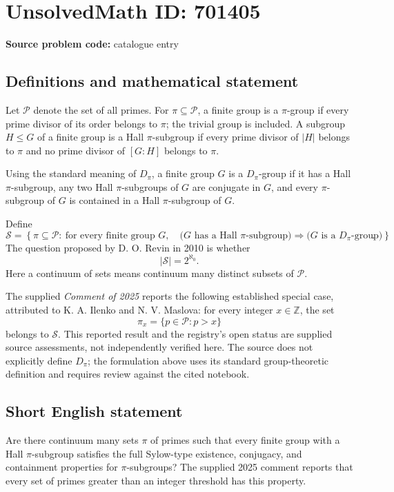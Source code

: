 \documentclass[11pt]{article}
\newcommand{\Z}{\mathbb{Z}}
\begin{document}
\section*{UnsolvedMath ID: 701405}
\textbf{Source problem code:} catalogue entry
\subsection{Definitions and mathematical statement}
Let \(\mathcal P\) denote the set of all primes. For \(\pi\subseteq\mathcal P\), a finite group is a \(\pi\)-group if every prime divisor of its order belongs to \(\pi\); the trivial group is included. A subgroup \(H\leq G\) of a finite group is a Hall \(\pi\)-subgroup if every prime divisor of \(|H|\) belongs to \(\pi\) and no prime divisor of \([G:H]\) belongs to \(\pi\).

Using the standard meaning of \(D_\pi\), a finite group \(G\) is a \(D_\pi\)-group if it has a Hall \(\pi\)-subgroup, any two Hall \(\pi\)-subgroups of \(G\) are conjugate in \(G\), and every \(\pi\)-subgroup of \(G\) is contained in a Hall \(\pi\)-subgroup of \(G\).

Define
\[
\mathcal S=\left\{\pi\subseteq\mathcal P:\ \text{for every finite group }G,\quad
\bigl(G\text{ has a Hall }\pi\text{-subgroup}\bigr)
\Longrightarrow
\bigl(G\text{ is a }D_\pi\text{-group}\bigr)
\right\}.
\]
The question proposed by D. O. Revin in 2010 is whether
\[
|\mathcal S|=2^{\aleph_0}.
\]
Here a continuum of sets means continuum many distinct subsets of \(\mathcal P\).

The supplied \emph{Comment of 2025} reports the following established special case, attributed to K. A. Ilenko and N. V. Maslova: for every integer \(x\in\Z\), the set
\[
\pi_x=\{p\in\mathcal P:p>x\}
\]
belongs to \(\mathcal S\). This reported result and the registry's open status are supplied source assessments, not independently verified here. The source does not explicitly define \(D_\pi\); the formulation above uses its standard group-theoretic definition and requires review against the cited notebook.
\subsection{Short English statement}
Are there continuum many sets \(\pi\) of primes such that every finite group with a Hall \(\pi\)-subgroup satisfies the full Sylow-type existence, conjugacy, and containment properties for \(\pi\)-subgroups? The supplied 2025 comment reports that every set of primes greater than an integer threshold has this property.
\end{document}

